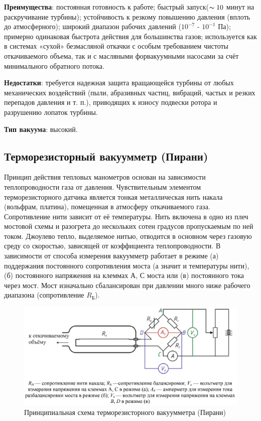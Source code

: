 \documentclass[a4paper, 12pt]{article} %
\begin{document}
\textbf{Преимущества}: постоянная готовность к работе; быстрый запуск($\thicksim 10$ минут на раскручивание турбины); устойчивость к резкому повышению давления (вплоть до атмосферного); широкий диапазон рабочих давлений ($10^{-7}$ - $10^{-1}$ Па); примерно одинаковая быстрота действия для большинства газов; используется как в системах «сухой» безмасляной откачки с особым требованием чистоты откачиваемого объема, так и с масляными форвакуумными насосами за счёт минимального обратного потока.

\textbf{Недостатки}: требуется надежная защита вращающейся турбины от любых механических воздействий (пыли, абразивных частиц, вибраций, частых и резких перепадов давления и т. п.), приводящих к износу подвески ротора и разрушению лопаток турбины.

\textbf{Тип вакуума}: высокий.


\subsection{Терморезисторный вакуумметр (Пирани)}

Принцип действия тепловых манометров основан на зависимости
теплопроводности газа от давления. Чувствительным элементом терморезисторного датчика является тонкая металлическая нить накала (вольфрам, платина), помещенная в атмосферу откачиваемого газа. Сопротивление нити зависит от её температуры. Нить включена в одно из плеч мостовой схемы и разогрета до нескольких сотен градусов пропускаемым по ней током. Джоулево тепло, выделяемое нитью, отводится в основном через газовую среду со скоростью, зависящей от коэффициента теплопроводности. В зависимости от способа измерения вакуумметр работает в режиме (а) поддержания постоянного сопротивления моста (а значит и температуры нити), (б) постоянного напряжения на клеммах $А$, $С$ моста или (в) постоянного тока через мост. Мост изначально сбалансирован при давлении много ниже рабочего диапазона (сопротивление $R_{\text{Б}}$).

\begin{figure}[h]
    \centering
    \includegraphics[width = 13 cm]{5}
    \caption{Принципиальная схема терморезисторного вакуумметра (Пирани)}
    \label{fig:vac}
\end{figure}
\end{document}
